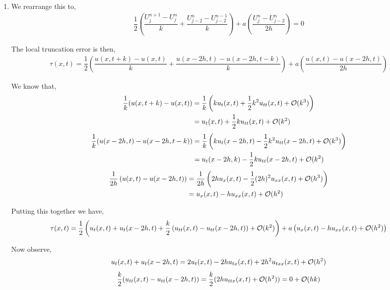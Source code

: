 \documentclass[10pt]{article}
\begin{document}
\begin{solution}[Solution]

\begin{enumerate}[label=(\alph*)]
    \item We rearrange this to,
    \begin{align*}
        \dfrac{1}{2} \left( \dfrac{U_{j}^{n+1} - U_j^n}{k} + \dfrac{U_{j-2}^n-U_{j-2}^{n-1}}{k} \right) + a \left( \dfrac{U_{j}^{n} - U_{j-2}^{n} }{2h} \right) = 0
    \end{align*}

    The local truncation error is then,
    \begin{align*}
        \tau(x,t) = \dfrac{1}{2} \left( \dfrac{u(x,t+k) - u(x,t)}{k} + \dfrac{u(x-2h,t)-u(x-2h,t-k)}{k} \right)
        + a \left( \dfrac{u(x,t) - u(x-2h,t)}{2h} \right)
    \end{align*}

    We know that,
    \begin{align*}
        \dfrac{1}{k}(u(x,t+k) - u(x,t))
        &= \dfrac{1}{k} \left( k u_t(x,t) + \dfrac{1}{2}k^2 u_{tt}(x,t) + \mathcal{O}(k^3) \right)
        \\&= u_t(x,t) + \dfrac{1}{2}k u_{tt}(x,t) + \mathcal{O}(k^2)
    \end{align*}
    \begin{align*}
        \dfrac{1}{k}(u(x-2h,t)-u(x-2h,t-k))
        &= \dfrac{1}{k} \left( ku_t(x-2h,t) - \dfrac{1}{2}k^2 u_{tt}(x-2h,t) + \mathcal{O}(k^3) \right)
        \\&= u_t(x-2h,k) - \dfrac{1}{2}k u_{tt}(x-2h,t) + \mathcal{O}(k^2)
    \end{align*}
    \begin{align*}
        \dfrac{1}{2h}\left( u(x,t) - u(x-2h,t) \right)
        &= \dfrac{1}{2h}\left( 2h u_x(x,t) - \dfrac{1}{2}(2h)^2u_{xx}(x,t) + \mathcal{O}(h^3) \right)
        \\&= u_x(x,t) - hu_{xx}(x,t) + \mathcal{O}(h^2)
    \end{align*}

    Putting this together we have,
    \begin{align*}
        \tau(x,t) = \dfrac{1}{2} \left( u_t(x,t) + u_t(x-2h,t) + \dfrac{k}{2}\left( u_{tt}(x,t)-u_{tt}(x-2h,t) \right) + \mathcal{O}(k^2)\right) + a \left( u_x(x,t) - hu_{xx}(x,t) + \mathcal{O}(h^2) \right)
    \end{align*}

    Now observe,
    \begin{align*}
        u_t(x,t) + u_t(x-2h,t) = 2u_t(x,t) - 2hu_{tx}(x,t) + 2h^2u_{txx}(x,t) + \mathcal{O}(h^2)
    \end{align*}
    \begin{align*}
        \dfrac{k}{2}(u_{tt}(x,t) - u_{tt}(x-2h,t)) = \dfrac{k}{2}(2hu_{ttx}(x,t) + \cO(h^2)) = 0 + \cO(hk) %
    \end{align*}


\end{enumerate}
\end{solution}
\end{document}
